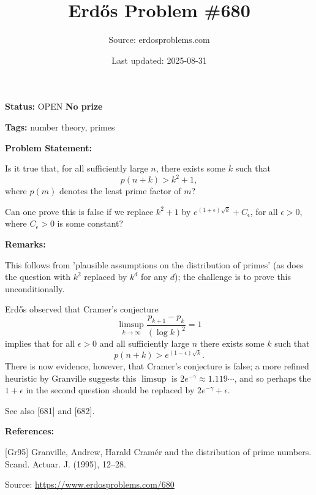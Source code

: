 \documentclass{article}
\title{Erd\H{o}s Problem \#680}
\date{Last updated: 2025-08-31}
\author{Source: erdosproblems.com}
\begin{document}
\maketitle

\noindent\textbf{Status:} OPEN \quad \textbf{No prize}

\noindent\textbf{Tags:} number theory, primes

\medskip
\noindent\textbf{Problem Statement:}

Is it true that, for all sufficiently large $n$, there exists some $k$ such that\[p(n+k)>k^2+1,\]where $p(m)$ denotes the least prime factor of $m$?

Can one prove this is false if we replace $k^2+1$ by $e^{(1+\epsilon)\sqrt{k}}+C_\epsilon$, for all $\epsilon>0$, where $C_\epsilon>0$ is some constant?

\bigskip
\noindent\textbf{Remarks:}

This follows from 'plausible assumptions on the distribution of primes' (as does the question with $k^2$ replaced by $k^d$ for any $d$); the challenge is to prove this unconditionally.

Erd\H{o}s observed that Cramer's conjecture\[\limsup_{k\to \infty} \frac{p_{k+1}-p_k}{(\log k)^2}=1\]implies that for all $\epsilon>0$ and all sufficiently large $n$ there exists some $k$ such that\[p(n+k)>e^{(1-\epsilon)\sqrt{k}}.\]There is now evidence, however, that Cramer's conjecture is false; a more refined heuristic by Granville \cite{Gr95} suggests this $\limsup$ is $2e^{-\gamma}\approx 1.119\cdots$, and so perhaps the $1+\epsilon$ in the second question should be replaced by $2e^{-\gamma}+\epsilon$.

See also [681] and [682].

\bigskip
\noindent\textbf{References:}

[Gr95] Granville, Andrew, Harald {C}ram\'{e}r and the distribution of prime numbers. Scand. Actuar. J. (1995), 12--28.

\bigskip
\noindent\small{Source: \url{https://www.erdosproblems.com/680}}
\end{document}
